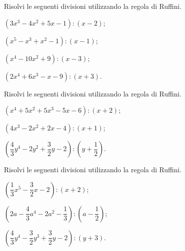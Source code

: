\begin{esercizio}[\Ast]
\label{ese:11.32}
Risolvi le seguenti divisioni utilizzando la regola di Ruffini.
\begin{multicols}{2}
 \begin{enumeratea}
 \item $\left(3x^{3}-4x^{2}+5x-1\right):(x-2)$;
 \item $\left(x^{5}-x^{3}+x^{2}-1\right):(x-1)$;
 \item $\left(x^{4}-10x^{2}+9\right):(x-3)$;
 \item $\left(2x^{4}+6x^{3}-x-9\right):(x+3)$.
 \end{enumeratea}
\end{multicols}
\end{esercizio}

\begin{esercizio}[\Ast]
\label{ese:11.33}
Risolvi le seguenti divisioni utilizzando la regola di Ruffini.
\begin{multicols}{2}
 \begin{enumeratea}
 \item $\left(x^{4}+5x^{2}+5x^{3}-5x-6 \right):(x+2)$;%
 \item $\left(4x^{3}-2x^{2}+2x-4 \right):(x+1)$;%
 \item $\left(\dfrac{4}{3}y^{4}-2y^{2}+\dfrac{3}{2}y-2\right):\left(y+\dfrac{1}{2}\right)$.%
 \end{enumeratea}
\end{multicols}
\end{esercizio}

\begin{esercizio}[\Ast]
\label{ese:11.34}
Risolvi le seguenti divisioni utilizzando la regola di Ruffini.
 \begin{enumeratea}
 \item $\left(\dfrac{1}{3}x^{5}-\dfrac{3}{2}x-2\right):(x+2)$;
 \item $\left(2a-\dfrac{4}{3}a^{4}-2a^{2}-\dfrac{1}{3}\right):\left(a-\dfrac{1}{2}\right)$;
 \item $\left(\dfrac{4}{3}y^{4}-\dfrac{3}{2}y^{3}+\dfrac{3}{2}y-2\right):\left(y+3\right)$.
 \end{enumeratea}
\end{esercizio}

